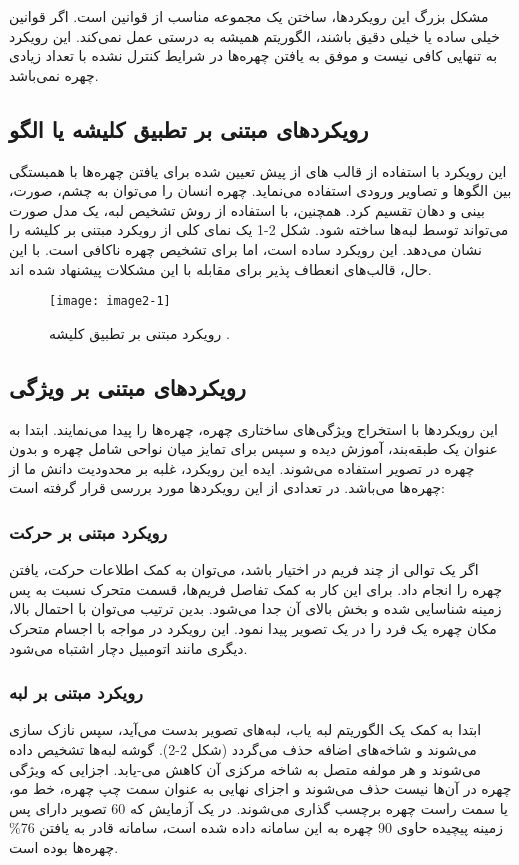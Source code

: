 مشکل بزرگ این رویکرد‌ها، ساختن یک مجموعه مناسب از قوانین است. اگر قوانین خیلی ساده یا خیلی دقیق باشند، الگوریتم همیشه به درستی عمل نمی‌کند. این رویکرد به تنهایی کافی نیست و موفق به یافتن چهره‌ها در شرایط کنترل نشده با تعداد زیادی چهره نمی‌باشد.

\subsection{رویکردهای مبتنی بر تطبیق کلیشه یا الگو}
این رویکرد با استفاده از قالب ‌های از پیش تعیین شده برای یافتن چهره‌ها با همبستگی بین الگوها و تصاویر ورودی استفاده می‌نماید. چهره انسان را می‌توان به چشم، صورت، بینی و دهان تقسیم کرد. همچنین، با استفاده از روش تشخیص لبه، یک مدل صورت می‌تواند توسط لبه‌ها ساخته شود. شکل 2-1 یک نمای کلی از رویکرد مبتنی بر کلیشه را نشان می‌دهد. این رویکرد ساده است، اما برای تشخیص چهره ناکافی است. با این حال، قالب‌های انعطاف پذیر برای مقابله با این مشکلات پیشنهاد شده اند.


\begin{figure}[h]
\centering
  \texttt{[image: image2-1]}
  \caption{رویکرد مبتنی بر تطبیق کلیشه  \cite{ref1}.}
  \label{image2-1}
\end{figure}

\subsection{رویکردهای مبتنی بر ویژگی}
این رویکردها‌ با استخراج ویژگی‌های ساختاری چهره، چهره‌ها را پیدا می‌نمایند. ابتدا به عنوان یک طبقه‌بند، آموزش دیده و سپس برای تمایز میان نواحی شامل چهره و بدون چهره در تصویر استفاده می‌شوند. ایده این رویکرد، غلبه بر محدودیت دانش ما از چهره‌ها می‌باشد. در \cite{HJELMAS2001236} تعدادی از این رویکردها مورد بررسی قرار گرفته است:

\subsubsection{رویکرد مبتنی بر حرکت}
اگر یک توالی از چند فریم در اختیار باشد، می‌توان به کمک اطلاعات حرکت، یافتن چهره را انجام داد. برای این کار به کمک تفاصل فریم‌ها، قسمت متحرک نسبت به پس زمینه شناسایی شده و بخش بالای آن جدا می‌شود. بدین ترتیب می‌توان با احتمال بالا، مکان چهره یک فرد را در یک تصویر پیدا نمود. این رویکرد در مواجه با اجسام متحرک دیگری مانند اتومبیل دچار اشتباه می‌شود.

\subsubsection{رویکرد مبتنی بر لبه}
ابتدا به کمک یک الگوریتم لبه یاب، لبه‌های تصویر بدست می‌آید، سپس نازک سازی می‌شوند و شاخه‌های اضافه حذف می‌گردد (شکل 2-2). گوشه لبه‌ها تشخیص داده می‌شوند و هر مولفه متصل  به شاخه مرکزی آن کاهش می-یابد. اجزایی که ویژگی چهره در آن‌ها نیست حذف می‌شوند و اجزای نهایی به عنوان سمت چپ چهره، خط مو، یا سمت راست چهره برچسب گذاری می‌شوند. در یک آزمایش که 60 تصویر دارای پس زمینه پیچیده حاوی 90 چهره به این سامانه داده شده است، سامانه قادر به یافتن 76\% چهره‌ها بوده است.

